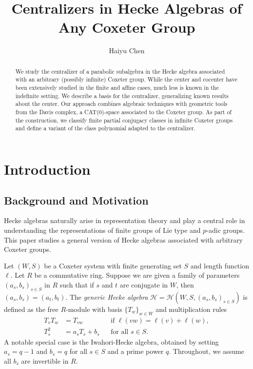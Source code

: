 \documentclass[a4paper, reqno, 14pt]{amsart}
\title{Centralizers in Hecke Algebras of Any Coxeter Group}
\author{Haiyu Chen}
\def\ch{\mathcal{H}}
\theoremstyle{definition}
\theoremstyle{remark}
\numberwithin{equation}{section}
\numberwithin{thm}{section}
\begin{document}
\maketitle
\begin{abstract}
We study the centralizer of a parabolic subalgebra in the Hecke algebra associated with an arbitrary (possibly infinite) Coxeter group. While the center and cocenter have been extensively studied in the finite and affine cases, much less is known in the indefinite setting. We describe a basis for the centralizer, generalizing known results about the center. Our approach combines algebraic techniques with geometric tools from the Davis complex, a CAT($0$)-space associated to the Coxeter group. As part of the construction, we classify finite partial conjugacy classes in infinite Coxeter groups and define a variant of the class polynomial adapted to the centralizer.
\end{abstract}




\section{Introduction}
\subsection{Background and Motivation}
Hecke algebras naturally arise in representation theory and play a central role in understanding the representations of finite groups of Lie type and $p$-adic groups. This paper studies a general version of Hecke algebras associated with arbitrary Coxeter groups.

Let $(W,S)$ be a Coxeter system with finite generating set $S$ and length function $\ell$. Let $R$ be a commutative ring. Suppose we are given a family of parameters $(a_s, b_s)_{s \in S}$ in $R$ such that if $s$ and $t$ are conjugate in $W$, then $(a_s, b_s) = (a_t, b_t)$. The \emph{generic Hecke algebra} $\mathcal{H} = \ch(W, S, (a_s, b_s)_{s \in S})$ is defined as the free $R$-module with basis $\{T_w\}_{w \in W}$ and multiplication rules
\[
\begin{aligned}
T_v T_w &= T_{vw} && \text{if } \ell(vw) = \ell(v) + \ell(w), \\
T_s^2 &= a_s T_s + b_s && \text{for all } s \in S.
\end{aligned}
\]
A notable special case is the Iwahori-Hecke algebra, obtained by setting $a_s = q - 1$ and $b_s = q$ for all $s \in S$ and a prime power $q$. Throughout, we assume all $b_s$ are invertible in $R$.
\end{document}
